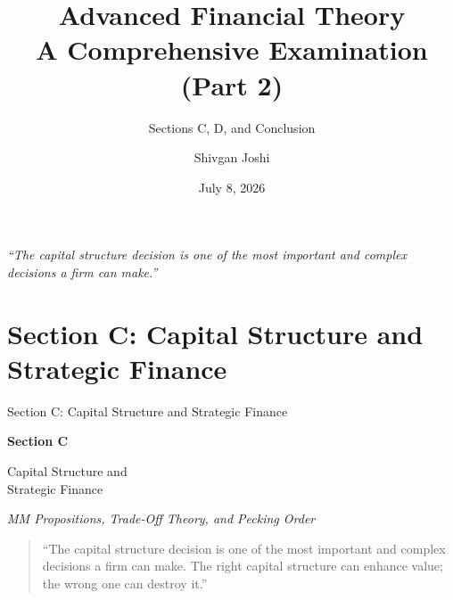 \documentclass[aspectratio=169]{beamer}
\title[Synoptic Examination]{Advanced Financial Theory \\[0.3cm]
	\large A Comprehensive Examination (Part 2)}
\subtitle{Sections C, D, and Conclusion}
\author{Shivgan Joshi}
\date{July 8, 2026}
\begin{document}
	
	\begin{frame}
		\titlepage
		\begin{center}
			\small \textit{``The capital structure decision is one of the most important and complex decisions a firm can make.''}
		\end{center}
	\end{frame}
	
	\section{Section C: Capital Structure and Strategic Finance}
	
	\begin{frame}{Section C: Capital Structure and Strategic Finance}
		\begin{center}
			\Huge\textcolor{navyblue}{\textbf{Section C}}
			\vspace{0.5cm}
			
			\huge Capital Structure and \\
			Strategic Finance
			\vspace{0.3cm}
			
			\large\textit{MM Propositions, Trade-Off Theory, and Pecking Order}
			\vspace{0.5cm}
			
			\begin{quotation}
				\small ``The capital structure decision is one of the most important and complex decisions a firm can make. The right capital structure can enhance value; the wrong one can destroy it.''
			\end{quotation}
		\end{center}
	\end{frame}
	
\end{document}
